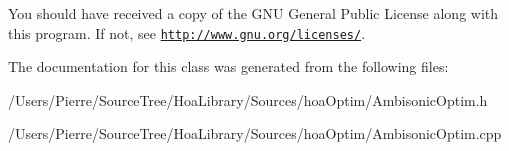 You should have received a copy of the G\-N\-U General Public License along with this program. If not, see \href{http://www.gnu.org/licenses/}{\tt http\-://www.\-gnu.\-org/licenses/}. 

The documentation for this class was generated from the following files\-:\begin{DoxyCompactItemize}
\item 
/\-Users/\-Pierre/\-Source\-Tree/\-Hoa\-Library/\-Sources/hoa\-Optim/Ambisonic\-Optim.\-h\item 
/\-Users/\-Pierre/\-Source\-Tree/\-Hoa\-Library/\-Sources/hoa\-Optim/Ambisonic\-Optim.\-cpp\end{DoxyCompactItemize}
